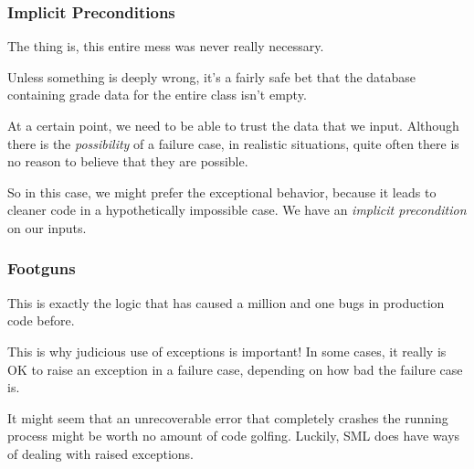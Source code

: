\documentclass[aspectratio=169]{beamer}
\begin{document}
\begin{frame}[fragile]
  \frametitle{Implicit Preconditions}

  The thing is, this entire mess was never really necessary. 

  \vspace{\fill}

  Unless something is deeply wrong, it's a fairly safe bet that
  the database containing grade data for the entire class  
  isn't empty.\footnotemark

  \vspace{\fill}

  At a certain point, we need to be able to trust the data that we input.
  Although there is the \textit{possibility} of a failure case, in realistic
  situations, quite often there is no reason to believe that they are possible.

  \vspace{\fill}

  So in this case, we might prefer the exceptional behavior, because it leads
  to cleaner code in a hypothetically impossible case. We have an 
  \textit{implicit precondition} on our inputs.

\end{frame}

\begin{frame}[fragile]
  \frametitle{Footguns}

  This is exactly the logic that has caused a million and one bugs in production
  code before.

  \vspace{\fill}

  This is why judicious use of exceptions is important! In some cases, it really
  is OK to raise an exception in a failure case, depending on how bad the 
  failure case is.

  \vspace{\fill}

  It might seem that an unrecoverable error that completely crashes the 
  running process might be worth no amount of code golfing. Luckily,
  SML does have ways of dealing with raised exceptions. 
\end{frame}

\end{document}
